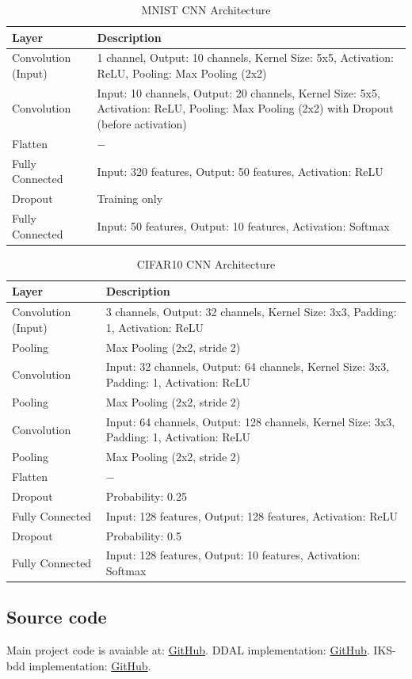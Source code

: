 \documentclass[a4paper]{article}
\begin{document}
\begin{table}
\centering
\begin{tabular}{|p{3cm}|p{11cm}|} 
\hline
\textbf{Layer} & \textbf{Description} \\ \hline
Convolution (Input) & 1 channel, Output: 10 channels, Kernel Size: 5x5, Activation: ReLU, Pooling: Max Pooling (2x2) \\ \hline
Convolution & Input: 10 channels, Output: 20 channels, Kernel Size: 5x5, Activation: ReLU, Pooling: Max Pooling (2x2) with Dropout (before activation) \\ \hline
Flatten & $-$   \\ \hline
Fully Connected & Input: 320 features, Output: 50 features, Activation: ReLU \\ \hline
Dropout & Training only  \\ \hline
Fully Connected & Input: 50 features, Output: 10 features, Activation: Softmax \\ \hline
\end{tabular}
\caption{MNIST CNN Architecture}
\label{tab:mnist_cnn}  
\end{table}


\begin{table}
\centering
\begin{tabular}{|p{3cm}|p{11cm}|} 
\hline
\textbf{Layer} & \textbf{Description} \\ \hline
Convolution (Input) & 3 channels, Output: 32 channels, Kernel Size: 3x3, Padding: 1, Activation: ReLU \\ \hline
Pooling & Max Pooling (2x2, stride 2) \\ \hline
Convolution & Input: 32 channels, Output: 64 channels, Kernel Size: 3x3, Padding: 1, Activation: ReLU \\ \hline
Pooling & Max Pooling (2x2, stride 2) \\ \hline
Convolution & Input: 64 channels, Output: 128 channels, Kernel Size: 3x3, Padding: 1, Activation: ReLU \\ \hline
Pooling & Max Pooling (2x2, stride 2) \\ \hline
Flatten & $-$  \\ \hline
Dropout & Probability: 0.25 \\ \hline
Fully Connected & Input: 128 features, Output: 128 features, Activation: ReLU \\ \hline
Dropout & Probability: 0.5 \\ \hline
Fully Connected & Input: 128 features, Output: 10 features, Activation: Softmax \\ \hline
\end{tabular}
\caption{CIFAR10 CNN Architecture}
\label{tab:cifar_cnn}  
\end{table}

\subsection{Source code}

Main project code is avaiable at:
\href{https://github.com/ranUser01/TinyML}{GitHub}.
DDAL implementation:
\href{https://github.com/ranUser01/DDAL}{GitHub}.
IKS-bdd implementation:
\href{https://github.com/ranUser01/incremental_ks}{GitHub}.
\end{document}
